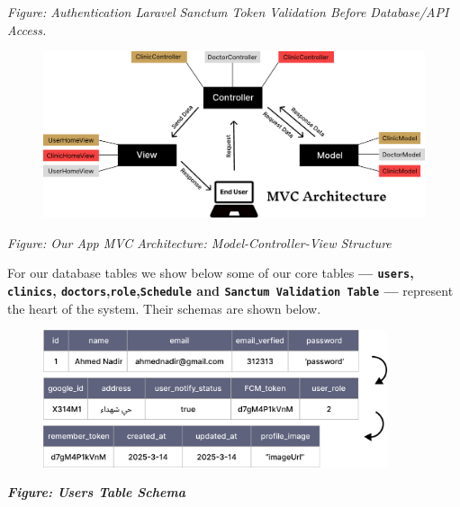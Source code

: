 \documentclass[12pt]{report}
\begin{document}
\begin{center}
	\vspace*{0.3cm}
	\textit{Figure: Authentication Laravel Sanctum Token Validation Before Database/API Access.}
\end{center}
\vspace*{0.8cm}
\begin{figure}[H]
	\centering
	\includegraphics[width=1\textwidth]{images/MVC@2x.pdf}
\end{figure}
\begin{center}
	\vspace*{0.3cm}
	\textit{Figure: Our App MVC Architecture: Model-Controller-View Structure }
\end{center}


\newpage
\noindent For our database tables we show below some of our core tables \textbf{— \texttt{users}, \texttt{clinics}, \texttt{doctors},\texttt{role},\texttt{Schedule} and \texttt{Sanctum Validation Table} — }represent the heart of the system. Their schemas are shown below.
\vspace*{0.5cm}
\begin{figure}[H]
	\centering
	\includegraphics[width=0.9\textwidth]{images/user_table.pdf}
\end{figure}
\begin{center}

	\textbf{\textit{Figure: Users Table Schema}}
\end{center}
\end{document}
